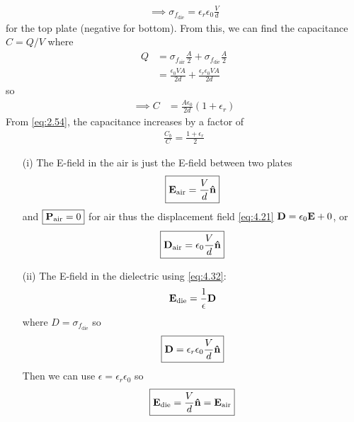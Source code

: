 \documentclass[../main.tex]{subfiles}
\begin{document}
\begin{itemize}
\begin{align*}
        \implies \boxed{
            \sigma_{f_\text{die}} = \epsilon_r \epsilon_0 \frac{V}{d}
        }
    \end{align*}
    for the top plate (negative for bottom). From this, we can find the capacitance $C = Q/V$ where
    \begin{align*}
        Q &= \sigma_{f_\text{air}} \frac{A}{2} + \sigma_{f_\text{die}} \frac{A}{2} \\
        &= \frac{\epsilon_0 V A}{2d} + \frac{\epsilon_r \epsilon_0 V A}{2d} 
    \end{align*}
    so
    \begin{align*}
        \implies C &= \frac{A\epsilon_0}{2d} (1 + \epsilon_r)  
    \end{align*}
    From \eqref{eq:2.54}, the capacitance increases by a factor of
    \begin{align*}
        \boxed{
            \frac{C_b}{C} = \frac{1 + \epsilon_r}{2}
        }
    \end{align*}
    \begin{itemize}
        \item [(i)] The E-field in the air is just the E-field between two plates
        \begin{align*}
            \boxed{
                \vb E_\text{air} = \frac{V}{d} \vu n
            }
        \end{align*}
        and $\boxed{\vb P_\text{air} = 0}$ for air thus the displacement field \eqref{eq:4.21} $\vb D = \epsilon_0 \vb E + 0 $, or 
        \begin{align*}
            \boxed{
                \vb D_\text{air} = \epsilon_0 \frac{V}{d} \vu n
            }
        \end{align*}
        \item [(ii)] The E-field in the dielectric using \eqref{eq:4.32}:
        \begin{align*}
            \vb E_\text{die} = \frac{1}{\epsilon} \vb D
        \end{align*}
        where $D = \sigma_{f_\text{die}}$ so
        \begin{align*}
            \boxed{
                \vb D = \epsilon_r \epsilon_0 \frac{V}{d} \vu n
            }
        \end{align*}
        Then we can use $\epsilon = \epsilon_r \epsilon_0$ so
        \begin{align*}
            \boxed{
                \vb E_\text{die} = \frac{V}{d} \vu n = \vb E_\text{air}
            }
        \end{align*}

\end{itemize}
\end{itemize}
\end{document}
